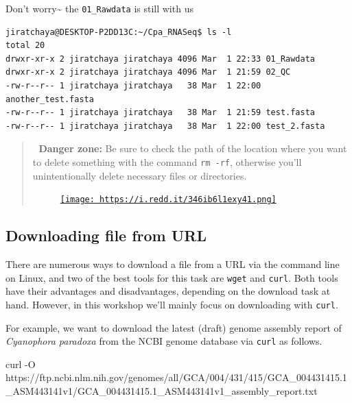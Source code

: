 \documentclass[
  letterpaper,
  DIV=11,
  numbers=noendperiod]{scrreprt}
\newenvironment{Shaded}{\begin{snugshade}}{\end{snugshade}}
\newcommand{\AttributeTok}[1]{\textcolor[rgb]{0.40,0.45,0.13}{#1}}
\newcommand{\ExtensionTok}[1]{\textcolor[rgb]{0.00,0.23,0.31}{#1}}
\newcommand{\NormalTok}[1]{\textcolor[rgb]{0.00,0.23,0.31}{#1}}
\begin{document}
Don't worry\textasciitilde{} the \texttt{01\_Rawdata} is still with us

\begin{verbatim}
jiratchaya@DESKTOP-P2DD13C:~/Cpa_RNASeq$ ls -l
total 20
drwxr-xr-x 2 jiratchaya jiratchaya 4096 Mar  1 22:33 01_Rawdata
drwxr-xr-x 2 jiratchaya jiratchaya 4096 Mar  1 21:59 02_QC
-rw-r--r-- 1 jiratchaya jiratchaya   38 Mar  1 22:00 another_test.fasta
-rw-r--r-- 1 jiratchaya jiratchaya   38 Mar  1 21:59 test.fasta
-rw-r--r-- 1 jiratchaya jiratchaya   38 Mar  1 22:00 test_2.fasta
\end{verbatim}

\begin{quote}
🚨 \textbf{Danger zone:} Be sure to check the path of the location where
you want to delete something with the command \texttt{rm\ -rf},
otherwise you'll unintentionally delete necessary files or directories.

\begin{figure}

{\centering 

\href{https://www.reddit.com/r/linuxmemes/comments/gk8k2x/why_i_prefer_using_rm_i_or_deleting_the_entire/}{\texttt{[image: https://i.redd.it/346ib6l1exy41.png]}}

}

\end{figure}
\end{quote}

\hypertarget{downloading-file-from-url}{%
\subsection*{Downloading file from
URL}\label{downloading-file-from-url}}

There are numerous ways to download a file from a URL via the command
line on Linux, and two of the best tools for this task are \texttt{wget}
and \texttt{curl}. Both tools have their advantages and disadvantages,
depending on the download task at hand. However, in this workshop we'll
mainly focus on downloading with \texttt{curl}.

For example, we want to download the latest (draft) genome assembly
report of \emph{Cyanophora paradoxa} from the NCBI genome database via
\texttt{curl} as follows.

\begin{Shaded}
\begin{Highlighting}[]
\ExtensionTok{curl} \AttributeTok{{-}O}\NormalTok{ https://ftp.ncbi.nlm.nih.gov/genomes/all/GCA/004/431/415/GCA\_004431415.1\_ASM443141v1/GCA\_004431415.1\_ASM443141v1\_assembly\_report.txt}
\end{Highlighting}
\end{Shaded}
\end{document}
